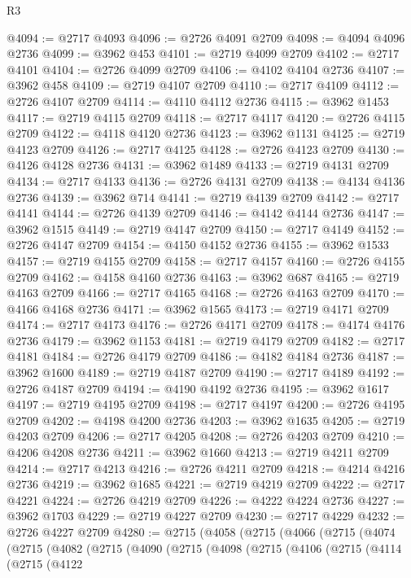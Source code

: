 \begin{lexlean}{R3}
\begin{coremodule}
@4094 := @2717 @4093
@4096 := @2726 @4091 @2709
@4098 := @4094 @4096 @2736
@4099 := @3962 @453
@4101 := @2719 @4099 @2709
@4102 := @2717 @4101
@4104 := @2726 @4099 @2709
@4106 := @4102 @4104 @2736
@4107 := @3962 @458
@4109 := @2719 @4107 @2709
@4110 := @2717 @4109
@4112 := @2726 @4107 @2709
@4114 := @4110 @4112 @2736
@4115 := @3962 @1453
@4117 := @2719 @4115 @2709
@4118 := @2717 @4117
@4120 := @2726 @4115 @2709
@4122 := @4118 @4120 @2736
@4123 := @3962 @1131
@4125 := @2719 @4123 @2709
@4126 := @2717 @4125
@4128 := @2726 @4123 @2709
@4130 := @4126 @4128 @2736
@4131 := @3962 @1489
@4133 := @2719 @4131 @2709
@4134 := @2717 @4133
@4136 := @2726 @4131 @2709
@4138 := @4134 @4136 @2736
@4139 := @3962 @714
@4141 := @2719 @4139 @2709
@4142 := @2717 @4141
@4144 := @2726 @4139 @2709
@4146 := @4142 @4144 @2736
@4147 := @3962 @1515
@4149 := @2719 @4147 @2709
@4150 := @2717 @4149
@4152 := @2726 @4147 @2709
@4154 := @4150 @4152 @2736
@4155 := @3962 @1533
@4157 := @2719 @4155 @2709
@4158 := @2717 @4157
@4160 := @2726 @4155 @2709
@4162 := @4158 @4160 @2736
@4163 := @3962 @687
@4165 := @2719 @4163 @2709
@4166 := @2717 @4165
@4168 := @2726 @4163 @2709
@4170 := @4166 @4168 @2736
@4171 := @3962 @1565
@4173 := @2719 @4171 @2709
@4174 := @2717 @4173
@4176 := @2726 @4171 @2709
@4178 := @4174 @4176 @2736
@4179 := @3962 @1153
@4181 := @2719 @4179 @2709
@4182 := @2717 @4181
@4184 := @2726 @4179 @2709
@4186 := @4182 @4184 @2736
@4187 := @3962 @1600
@4189 := @2719 @4187 @2709
@4190 := @2717 @4189
@4192 := @2726 @4187 @2709
@4194 := @4190 @4192 @2736
@4195 := @3962 @1617
@4197 := @2719 @4195 @2709
@4198 := @2717 @4197
@4200 := @2726 @4195 @2709
@4202 := @4198 @4200 @2736
@4203 := @3962 @1635
@4205 := @2719 @4203 @2709
@4206 := @2717 @4205
@4208 := @2726 @4203 @2709
@4210 := @4206 @4208 @2736
@4211 := @3962 @1660
@4213 := @2719 @4211 @2709
@4214 := @2717 @4213
@4216 := @2726 @4211 @2709
@4218 := @4214 @4216 @2736
@4219 := @3962 @1685
@4221 := @2719 @4219 @2709
@4222 := @2717 @4221
@4224 := @2726 @4219 @2709
@4226 := @4222 @4224 @2736
@4227 := @3962 @1703
@4229 := @2719 @4227 @2709
@4230 := @2717 @4229
@4232 := @2726 @4227 @2709
@4280 := @2715
    (@4058
      (@2715
        (@4066
          (@2715
            (@4074
              (@2715
                (@4082
                  (@2715
                    (@4090
                      (@2715
                        (@4098
                          (@2715
                            (@4106
                              (@2715
                                (@4114
                                  (@2715
                                    (@4122

\end{coremodule}
\end{lexlean}
